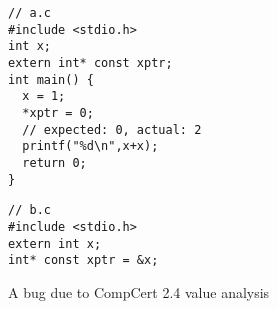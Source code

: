 
\begin{figure}
\begin{minipage}[t]{0.57\columnwidth}
\begin{verbatim}
// a.c             
#include <stdio.h> 
int x;
extern int* const xptr;
int main() {
  x = 1;
  *xptr = 0;
  // expected: 0, actual: 2
  printf("%d\n",x+x);
  return 0;
}
\end{verbatim}
\end{minipage}\begin{minipage}[t]{0.43\columnwidth}
\begin{verbatim}
// b.c
#include <stdio.h>          
extern int x;
int* const xptr = &x;
\end{verbatim}
\end{minipage}
\caption{A bug due to CompCert 2.4 value analysis}
\label{fig:sepcomp:constprop-bug}
\end{figure}


